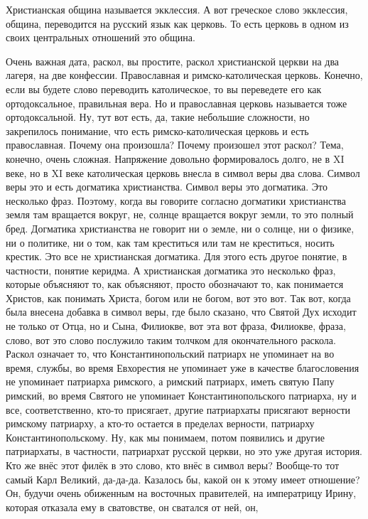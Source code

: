 Христианская община называется экклессия. А вот греческое слово экклессия,
община, переводится на русский язык как церковь. То есть церковь в одном из
своих центральных отношений это община. 

Очень важная дата, раскол, вы простите,
раскол христианской церкви на два лагеря, на две конфессии. Православная и
римско-католическая церковь. Конечно, если вы будете слово переводить
католическое, то вы переведете его как ортодоксальное, правильная вера. Но и
православная церковь называется тоже ортодоксальной. Ну, тут вот есть, да, такие
небольшие сложности, но закрепилось понимание, что есть римско-католическая
церковь и есть православная. Почему она произошла? Почему произошел этот раскол?
Тема, конечно, очень сложная. Напряжение довольно формировалось долго, не в XI
веке, но в XI веке католическая церковь внесла в символ веры два слова. Символ
веры это и есть догматика христианства. Символ веры это догматика. Это несколько
фраз. Поэтому, когда вы говорите согласно догматики христианства земля там
вращается вокруг, не, солнце вращается вокруг земли, то это полный бред.
Догматика христианства не говорит ни о земле, ни о солнце, ни о физике, ни о
политике, ни о том, как там креститься или там не креститься, носить крестик.
Это все не христианская догматика. Для этого есть другое понятие, в частности,
понятие керидма. А христианская догматика это несколько фраз, которые объясняют
то, как объясняют, просто обозначают то, как понимается Христов, как понимать
Христа, богом или не богом, вот это вот. Так вот, когда была внесена добавка в
символ веры, где было сказано, что Святой Дух исходит не только от Отца, но и
Сына, Филиокве, вот эта вот фраза, Филиокве, фраза, слово, вот это слово
послужило таким толчком для окончательного раскола. Раскол означает то, что
Константинопольский патриарх не упоминает на во время, службы, во время
Евхорестия не упоминает уже в качестве благословения не упоминает патриарха
римского, а римский патриарх, иметь святую Папу римский, во время Святого не
упоминает Константинопольского патриарха, ну и все, соответственно, кто-то
присягает, другие патриархаты присягают верности римскому патриарху, а кто-то
остается в пределах верности, патриарху Константинопольскому. Ну, как мы
понимаем, потом появились и другие патриархаты, в частности, патриархат русской
церкви, но это уже другая история. Кто же внёс этот филёк в это слово, кто внёс
в символ веры? Вообще-то тот самый Карл Великий, да-да-да. Казалось бы, какой он
к этому имеет отношение? Он, будучи очень обиженным на восточных правителей, на
императрицу Ирину, которая отказала ему в сватовстве, он сватался от ней, он,
